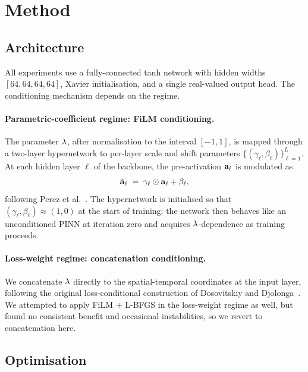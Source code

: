 \documentclass[12pt,a4paper]{extarticle}
\begin{document}
\newpage

\section{Method}
\label{sec:method}

\subsection{Architecture}

All experiments use a fully-connected tanh network with hidden widths $[64, 64, 64, 64]$, Xavier initialisation, and a single real-valued output head. The conditioning mechanism depends on the regime.

\paragraph{Parametric-coefficient regime: FiLM conditioning.}
The parameter $\lambda$, after normalisation to the interval $[-1, 1]$, is mapped through a two-layer hypernetwork to per-layer scale and shift parameters $\{(\gamma_\ell, \beta_\ell)\}_{\ell = 1}^{L}$. At each hidden layer $\ell$ of the backbone, the pre-activation $\mathbf{a}_\ell$ is modulated as
\begin{equation}
    \tilde{\mathbf{a}}_\ell \;=\; \gamma_\ell \odot \mathbf{a}_\ell + \beta_\ell,
    \label{eq:film-spec}
\end{equation}
following Perez et al.~\cite{perez2018film}. The hypernetwork is initialised so that $(\gamma_\ell, \beta_\ell) \approx (1, 0)$ at the start of training; the network then behaves like an unconditioned PINN at iteration zero and acquires $\lambda$-dependence as training proceeds.

\paragraph{Loss-weight regime: concatenation conditioning.}
We concatenate $\lambda$ directly to the spatial-temporal coordinates at the input layer, following the original loss-conditional construction of Dosovitskiy and Djolonga~\cite{dosovitskiy2020}. We attempted to apply FiLM + L-BFGS in the loss-weight regime as well, but found no consistent benefit and occasional instabilities, so we revert to concatenation here.

\subsection{Optimisation}
\end{document}

